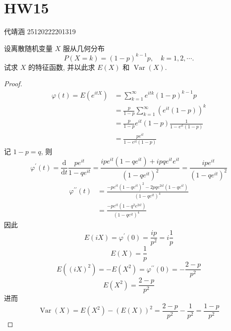 \documentclass[../main.tex]{subfiles}
\begin{document}
\ifSubfilesClassLoaded{

    
    \setcounter{chapter}{14}
}{}

\chapter{ HW15 }
 代靖涵 25120222201319
\begin{exercise}{}{}
设离散随机变量 $X$ 服从几何分布
\[
P(X=k) = (1-p)^{k-1}p, \quad k=1,2,\cdots.
\]
试求 $X$ 的特征函数, 并以此求 $E(X)$ 和 $\operatorname{Var}(X)$.
\end{exercise}

\begin{proof}
     \[
     \begin{aligned}
      \varphi \left( t \right)= E\left( e^{itX} \right)&= \sum _{k = 1}^{\infty} e^{itk}\left( 1-p \right)^{k-1}p \\ 
       &= \frac{p }{1-p } \sum _{k= 1}^{\infty}\left( e^{it}\left( 1-p \right)  \right)^{k}\\ 
        &= \frac{p }{1-p } e^{it}\left( 1-p \right)\frac{1 }{1-e^{it}\left( 1-p \right)  }\\ 
         &= \frac{pe^{it} }{1-e^{it}\left( 1-p \right)  }      
     \end{aligned}   
     \]记 \(  1-p  = q\), 则 \[
      \varphi ^{\prime} \left( t \right)= \frac{\mathrm{d}}{\mathrm{d}t} \frac{pe^{it} }{1-qe^{it} }=  \frac{ipe^{it} \left( 1-qe^{it} \right)+  ipqe^{it}e^{it}  }{ \left( 1-qe^{it} \right)^{2} }= \frac{ipe^{it} }{\left( 1-qe^{it} \right)^{2}  }    
     \]  \[
    \begin{aligned}
      \varphi ^{\prime \prime} \left( t \right)&=  \frac{-pe^{it}\left( 1-qe^{it} \right)^{2}-2pqe^{2it}\left( 1-qe^{it} \right)    }{\left( 1-qe^{it} \right)^{4}  }\\ 
       &=  \frac{-pe^{it}\left( 1-q^{2}e^{2it}\right)  }{\left( 1-qe^{it} \right)^{4}  } 
    \end{aligned} 
     \]因此 \[
     E\left( iX \right)=   \varphi ^{\prime} \left( 0 \right)= \frac{ip }{p^{2} }= i\frac{1 }{p }   
     \] \[
     E\left( X \right)= \frac{1 }{p }  
     \] \[
     E\left( \left( iX \right)^{2} \right)= -E\left( X^{2} \right) =    \varphi ^{\prime \prime} \left( 0 \right)  = -\frac{2-p }{p^{2} } 
     \] \[
     E\left( X^{2} \right)= \frac{2-p }{p^{2} }  
     \]进而 \[
     \operatorname{Var}\left( X \right)= E\left( X^{2} \right)-\left( E\left( X \right)  \right)^{2}= \frac{2-p }{p^{2} }-\frac{1 }{p^{2} }= \frac{1-p }{p^{2} }      
     \]
\end{proof}
\end{document}
